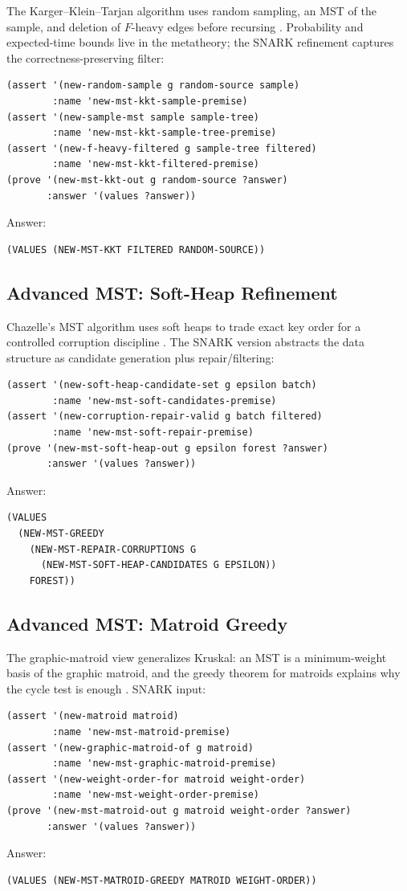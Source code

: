 \documentclass[runningheads]{llncs}
\begin{document}
The Karger--Klein--Tarjan algorithm uses random sampling, an MST of the sample,
and deletion of \(F\)-heavy edges before recursing
\cite{KargerKleinTarjan1995}.  Probability and expected-time bounds live in
the metatheory; the SNARK refinement captures the correctness-preserving
filter:
\begin{lstlisting}
(assert '(new-random-sample g random-source sample)
        :name 'new-mst-kkt-sample-premise)
(assert '(new-sample-mst sample sample-tree)
        :name 'new-mst-kkt-sample-tree-premise)
(assert '(new-f-heavy-filtered g sample-tree filtered)
        :name 'new-mst-kkt-filtered-premise)
(prove '(new-mst-kkt-out g random-source ?answer)
       :answer '(values ?answer))
\end{lstlisting}
Answer:
\begin{lstlisting}
(VALUES (NEW-MST-KKT FILTERED RANDOM-SOURCE))
\end{lstlisting}

\subsection{Advanced MST: Soft-Heap Refinement}

Chazelle's MST algorithm uses soft heaps to trade exact key order for a
controlled corruption discipline \cite{Chazelle2000}.  The SNARK version
abstracts the data structure as candidate generation plus repair/filtering:
\begin{lstlisting}
(assert '(new-soft-heap-candidate-set g epsilon batch)
        :name 'new-mst-soft-candidates-premise)
(assert '(new-corruption-repair-valid g batch filtered)
        :name 'new-mst-soft-repair-premise)
(prove '(new-mst-soft-heap-out g epsilon forest ?answer)
       :answer '(values ?answer))
\end{lstlisting}
Answer:
\begin{lstlisting}
(VALUES
  (NEW-MST-GREEDY
    (NEW-MST-REPAIR-CORRUPTIONS G
      (NEW-MST-SOFT-HEAP-CANDIDATES G EPSILON))
    FOREST))
\end{lstlisting}

\subsection{Advanced MST: Matroid Greedy}

The graphic-matroid view generalizes Kruskal: an MST is a minimum-weight basis
of the graphic matroid, and the greedy theorem for matroids explains why the
cycle test is enough \cite{Edmonds1971,PettieRamachandran2002}.
SNARK input:
\begin{lstlisting}
(assert '(new-matroid matroid)
        :name 'new-mst-matroid-premise)
(assert '(new-graphic-matroid-of g matroid)
        :name 'new-mst-graphic-matroid-premise)
(assert '(new-weight-order-for matroid weight-order)
        :name 'new-mst-weight-order-premise)
(prove '(new-mst-matroid-out g matroid weight-order ?answer)
       :answer '(values ?answer))
\end{lstlisting}
Answer:
\begin{lstlisting}
(VALUES (NEW-MST-MATROID-GREEDY MATROID WEIGHT-ORDER))
\end{lstlisting}
\end{document}
